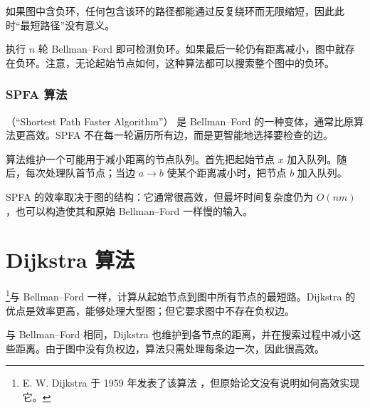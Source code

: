 如果图中含负环，任何包含该环的路径都能通过反复绕环而无限缩短，因此此时“最短路径”没有意义。

执行 $n$ 轮 Bellman--Ford 即可检测负环。如果最后一轮仍有距离减小，图中就存在负环。注意，无论起始节点如何，这种算法都可以搜索整个图中的负环。

\subsubsection{SPFA 算法}


（“Shortest Path Faster Algorithm”）\cite{fan94} 是 Bellman--Ford 的一种变体，通常比原算法更高效。SPFA 不在每一轮遍历所有边，而是更智能地选择要检查的边。

算法维护一个可能用于减小距离的节点队列。首先把起始节点 $x$ 加入队列。随后，每次处理队首节点；当边 $a \rightarrow b$ 使某个距离减小时，把节点 $b$ 加入队列。
% 
% 

SPFA 的效率取决于图的结构：它通常很高效，但最坏时间复杂度仍为 $O(nm)$，也可以构造使其和原始 Bellman--Ford 一样慢的输入。

\section{Dijkstra 算法}


\footnote{E. W. Dijkstra 于 1959 年发表了该算法 \cite{dij59}，但原始论文没有说明如何高效实现它。}与 Bellman--Ford 一样，计算从起始节点到图中所有节点的最短路。Dijkstra 的优点是效率更高，能够处理大型图；但它要求图中不存在负权边。

与 Bellman--Ford 相同，Dijkstra 也维护到各节点的距离，并在搜索过程中减小这些距离。由于图中没有负权边，算法只需处理每条边一次，因此很高效。

